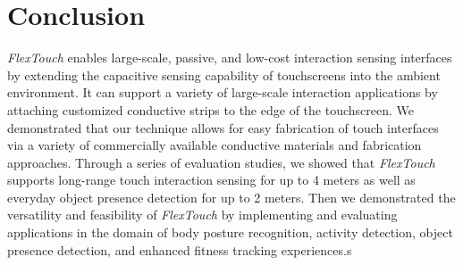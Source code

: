 \section{Conclusion}
\textit{FlexTouch} enables large-scale, passive, and low-cost interaction sensing interfaces by extending the capacitive sensing capability of touchscreens into the ambient environment. It can support a variety of large-scale interaction applications by attaching customized conductive strips to the edge of the touchscreen. We demonstrated that our technique allows for easy fabrication of touch interfaces via a variety of commercially available conductive materials and fabrication approaches. Through a series of evaluation studies, we showed that \textit{FlexTouch} supports long-range touch interaction sensing for up to 4 meters as well as everyday object presence detection for up to 2 meters. Then we demonstrated the versatility and feasibility of \textit{FlexTouch} by implementing and evaluating applications in the domain of body posture recognition, activity detection, object presence detection, and enhanced fitness tracking experiences.s